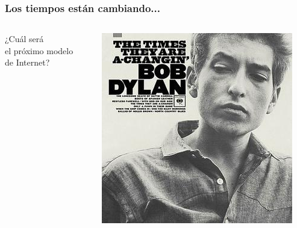 \documentclass[17pt,aspectratio=169,hyperref=pdfusetitle]{beamer}
\begin{document}
\begin{frame}[fragile]
  \frametitle{Los tiempos están cambiando...}

\begin{columns}
  \begin{column}{0.7\textwidth}
    {\Large ¿Cuál será \\
    el próximo modelo \\
    de Internet? \\ }
  \end{column}
  \begin{column}{0.3\textwidth}  %
    \begin{center}
      \includegraphics[width=\textwidth]{figs/The_Times_They_Are_a_Changin}
    \end{center}
  \end{column}
\end{columns}
  
\end{frame}

\end{document}
